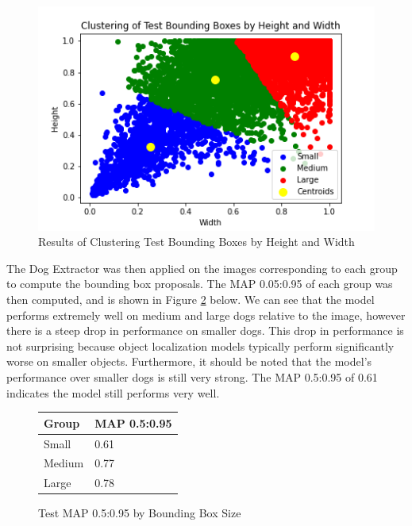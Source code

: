 \documentclass{article}
\begin{document}
\begin{figure}[h]
\centering
	\includegraphics[scale=0.7]{final-report-images/box_clusters.png}
\caption{Results of Clustering Test Bounding Boxes by Height and Width}
\label{fig:x box clusters}
\end{figure}
\noindent The Dog Extractor was then applied on the images corresponding to each group to compute the bounding box proposals.  The MAP 0.05:0.95 of each group was then computed, and is shown in Figure \ref{fig:box size} below.  We can see that the model performs extremely well on medium and large dogs relative to the image, however there is a steep drop in performance on smaller dogs.  This drop in performance is not surprising because object localization models typically perform significantly worse on smaller objects.  Furthermore, it should be noted that the model's performance over smaller dogs is still very strong.  The MAP 0.5:0.95 of 0.61 indicates the model still performs very well.

\begin{figure}[h]

\begin{center}

\begin{tabular}{|l|l|}
\hline
\textbf{Group} & \textbf{MAP 0.5:0.95} \\ \hline
Small          & 0.61                  \\ \hline
Medium         & 0.77                  \\ \hline
Large          & 0.78                  \\ \hline
\end{tabular}
\end{center}
\caption{Test MAP 0.5:0.95 by Bounding Box Size}
\label{fig:box size}
\end{figure}
\end{document}
